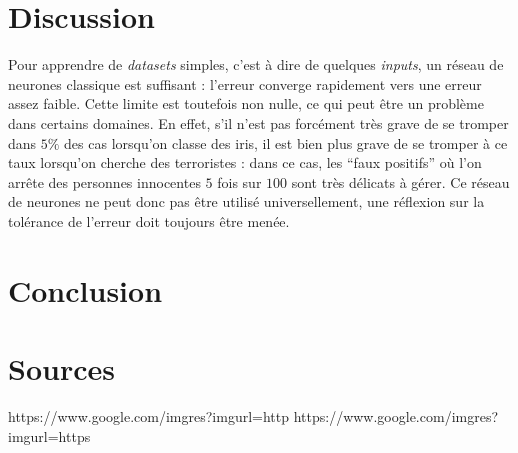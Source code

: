 \documentclass[a4paper,10pt]{article}
\begin{document}
\section{Discussion}

Pour apprendre de \textit{datasets} simples, c'est à dire de quelques \textit{inputs}, un réseau de neurones classique est suffisant : l'erreur converge
rapidement vers une erreur assez faible. Cette limite est toutefois non nulle, ce qui peut être un problème dans certains domaines. En effet, 
s'il n'est pas forcément très grave de se tromper dans $5 \% $ des cas lorsqu'on classe des iris, il est bien plus grave de se tromper à ce taux lorsqu'on 
cherche des terroristes : dans ce cas, les ``faux positifs'' où l'on arrête des personnes innocentes $5$ fois sur $100$ sont très délicats à gérer.
Ce réseau de neurones ne peut donc pas être utilisé universellement, une réflexion sur la tolérance de l'erreur doit toujours être menée.

\section{Conclusion}

\section{Sources}

https://www.google.com/imgres?imgurl=http%
https://www.google.com/imgres?imgurl=https%
\end{document}
